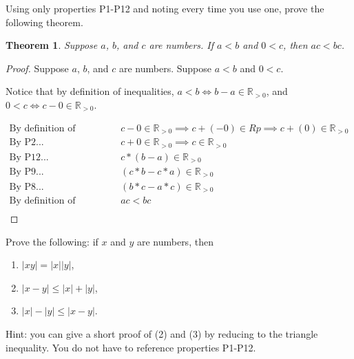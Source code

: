\documentclass{article} %
\theoremstyle{plain}
\newtheorem*{theorem*}{Theorem}
\newcommand{\abs}[1]{\left\lvert #1 \right\rvert} %
\newcommand{\Rp}{\mathbb{R}_{> 0}}
\begin{document}
\noindent{} Using only properties P1-P12 and noting every time you use one, prove the following theorem. 

\begin{theorem*}
Suppose $a$, $b$, and $c$ are numbers. If $a<b$ and $0 < c$, then $ac < bc$. 
\end{theorem*}


\begin{proof}  Suppose $a$, $b$, and $c$ are numbers. Suppose $a<b$ and $0 < c$. 

    Notice that by definition of inequalities, $a<b \iff b-a \in \Rp$, and $0<c \iff c-0 \in \Rp$.

    \begin{align*}
        \text{By definition of subtraction... } & c-0 \in \Rp \implies c + (-0) \in Rp \implies c + (0) \in \Rp \\
        \text{By P2... } & c + 0 \in \Rp \implies c \in \Rp \\
        \text{By P12... } & c * (b-a) \in \Rp \\
        \text{By P9... } & (c * b - c * a) \in \Rp \\
        \text{By P8... } & (b * c - a * c) \in \Rp \\
        \text{By definition of inequalities... } & ac < bc \\
    \end{align*}
\end{proof} 


\noindent{} Prove the following: if $x$ and $y$ are numbers, then 
\begin{enumerate}
\item $\abs{xy} = \abs{x}\abs{y}$, 
\item $\abs{x-y} \leq \abs{x}+\abs{y}$, 
\item $\abs{x}-\abs{y} \leq \abs{x-y}$. 
\end{enumerate}
Hint: you can give a short proof of (2) and (3) by reducing to the triangle inequality. You do not have to reference properties P1-P12.
\end{document}

